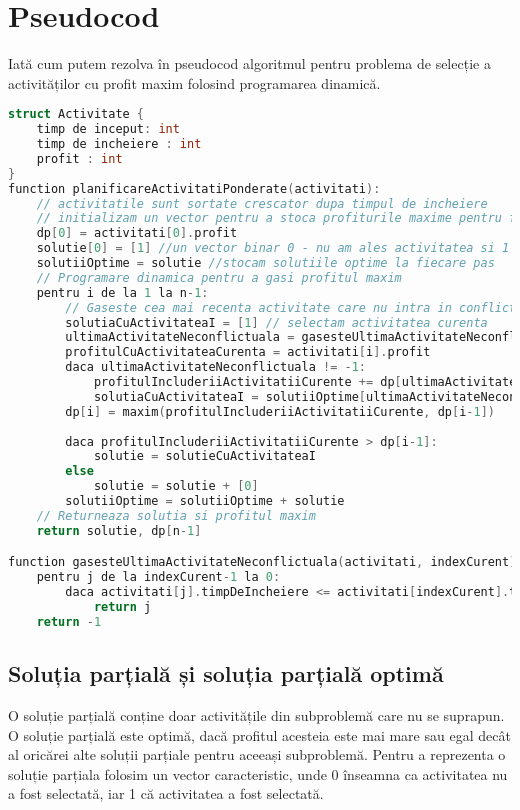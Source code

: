 \section{Pseudocod}
Iată cum putem rezolva în pseudocod algoritmul pentru problema de selecție a activităților cu profit maxim folosind programarea dinamică. 
\begin{lstlisting}[language=C++]
struct Activitate {
    timp de inceput: int
    timp de incheiere : int
    profit : int 
}
function planificareActivitatiPonderate(activitati):
    // activitatile sunt sortate crescator dupa timpul de incheiere
    // initializam un vector pentru a stoca profiturile maxime pentru fiecare activitate, fie dp un vector de dimensiune n, unde n este numarul de activitati
    dp[0] = activitati[0].profit
    solutie[0] = [1] //un vector binar 0 - nu am ales activitatea si 1 - am ales activitatea
    solutiiOptime = solutie //stocam solutiile optime la fiecare pas
    // Programare dinamica pentru a gasi profitul maxim
    pentru i de la 1 la n-1:
        // Gaseste cea mai recenta activitate care nu intra in conflict cu activitatea curenta
        solutiaCuActivitateaI = [1] // selectam activitatea curenta
        ultimaActivitateNeconflictuala = gasesteUltimaActivitateNeconflictuala(activitati, i)
        profitulCuActivitateaCurenta = activitati[i].profit
        daca ultimaActivitateNeconflictuala != -1:
            profitulIncluderiiActivitatiiCurente += dp[ultimaActivitateNeconflictuala]
            solutiaCuActivitateaI = solutiiOptime[ultimaActivitateNeconflictuala] + solutiaCuActivitateaI
        dp[i] = maxim(profitulIncluderiiActivitatiiCurente, dp[i-1])
        
        daca profitulIncluderiiActivitatiiCurente > dp[i-1]:
            solutie = solutieCuActivitateaI
        else
            solutie = solutie + [0]
        solutiiOptime = solutiiOptime + solutie 
    // Returneaza solutia si profitul maxim
    return solutie, dp[n-1]

function gasesteUltimaActivitateNeconflictuala(activitati, indexCurent):
    pentru j de la indexCurent-1 la 0:
        daca activitati[j].timpDeIncheiere <= activitati[indexCurent].timpDeInceput:
            return j
    return -1
\end{lstlisting}

\subsection{Soluția parțială și soluția parțială optimă}
O soluție parțială conține doar activitățile din subproblemă care nu se suprapun. O soluție parțială este optimă, dacă profitul acesteia este mai mare sau egal decât al oricărei alte soluții parțiale pentru aceeași subproblemă. Pentru a reprezenta o soluție parțiala folosim un vector caracteristic, unde 0 înseamna ca activitatea nu a fost selectată, iar 1 că activitatea a fost selectată. \\ 

